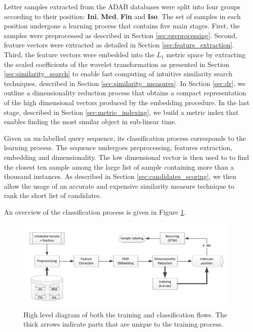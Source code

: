 \iftoggle{edit-mode}{\hspace{0pt}\marginpar{The learning process}}{}
Letter samples extracted from the ADAB databases were split into four groups according to their position: \textbf{Ini}, \textbf{Med}, \textbf{Fin} and \textbf{Iso}. 
The set of samples in each position undergone a learning process that contains five main stages.
First, the samples were preprocessed as described in Section \ref{sec:preprocessing}.
Second, feature vectors were extracted as detailed in Section \ref{sec:feature_extraction}.
Third, the feature vectors were embedded into the $L_1$ metric space by extracting the scaled coefficients of the wavelet transformation as presented in Section \ref{sec:similarity_search} to enable fast computing of intuitive similarity search techniques, described in Section \ref{sec:similarity_measures}.
In Section \ref{sec:dr}, we outline a dimensionality reduction process that obtains a compact representation of the high dimensional vectors produced by the embedding procedure.
In the last stage, described in Section \ref{sec:metric_indexing}, we build a metric index that enables finding the most similar object in sub-linear time.

\iftoggle{edit-mode}{\hspace{0pt}\marginpar{The recognition process}}{}
Given an un-labelled query sequence, its classification process corresponds to the learning process.
The sequence undergoes preprocessing, features extraction, embedding and dimensionality.
The low dimensional vector is then used to to find the closest ten sample among the large list of sample containing more than a thousand instances.
As described in Section \ref{sec:candidates_scoring}, we then allow the usage of an accurate and expensive similarity measure technique to rank the short list of candidates. 

An overview of the classification process is given in Figure \ref{fig:letters_classifier_learning_flow}.

\begin{figure}
\centering
\includegraphics[width=1\textwidth]{./figures/letters_classifier_learning_flow2}
\caption{High level diagram of both the training and classification flows. The thick arrows indicate parts that are unique to the training process.}
\label{fig:letters_classifier_learning_flow}
\end{figure}


